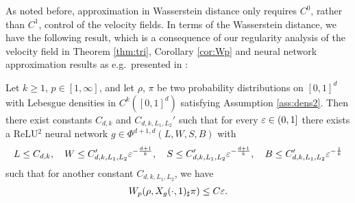 As noted before, approximation in Wasserstein distance only %
requires $C^0$, 
rather than $C^1$, control of the velocity fields. In terms of the Wasserstein distance, we have the following result,
which is a consequence of our regularity analysis of the velocity
field in Theorem \ref{thm:tri}, Corollary \ref{cor:Wp} and neural
network approximation results as e.g.\ presented in
\cite{StatisticalNODE}:
\begin{proposition}\label{prop:WpNN}
  Let $k\ge 1$, $p\in [1,\infty]$, and let $\rho$, $\pi$ be two
  probability distributions on $[0,1]^d$
  with Lebesgue densities in 
  $C^k([0,1]^d)$ satisfying Assumption \ref{ass:dens2}.
%
  Then there exist constants $C_{d,k}$ and $C_{d, k, L_1, L_2}'$ such that for every $\varepsilon\in (0,1]$ there exists a ReLU$^2$ neural network $g\in\Phi^{d+1,d}(L, W, S, B)$ with
  \begin{equation*}\label{eq:NNbounds1}
  L \leq C_{d,k},\quad
  W \leq C_{d, k, L_1, L_2}'\varepsilon^{-\frac{d+1}{k}},\quad
  S\leq C_{d, k, L_1, L_2}'\varepsilon^{-\frac{d+1}{k}},\quad
  B\leq C_{d, k, L_1,L_2}'\varepsilon^{-\frac{1}{k}}
\end{equation*}
such that for another constant $C_{d, k, L_1, L_2}$, we have
  \begin{equation*}
    W_p(\rho,X_g(\cdot,1)_\sharp\pi)\le C \varepsilon.
  \end{equation*}
\end{proposition}
